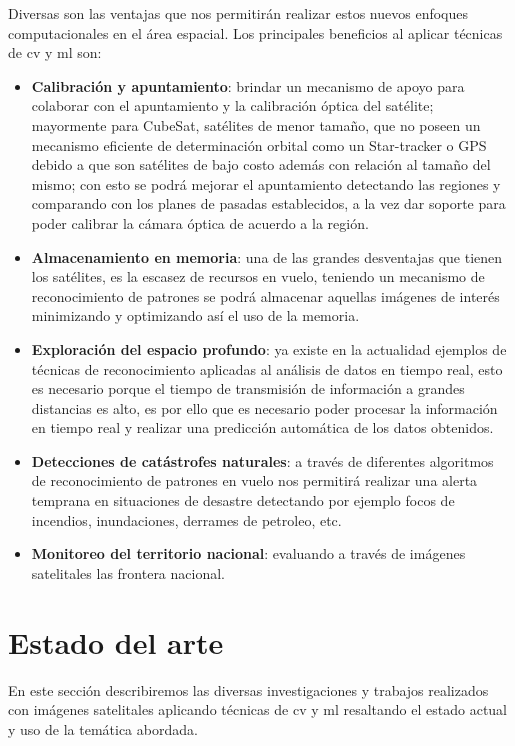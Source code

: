 Diversas son las ventajas que nos permitirán realizar estos nuevos enfoques computacionales en el área espacial. Los principales beneficios al aplicar técnicas de \ac{cv} y \ac{ml} son: 
\begin{itemize}
\item \textbf{Calibración y apuntamiento}: brindar un mecanismo de apoyo para colaborar con el apuntamiento y la calibración óptica del satélite; mayormente para CubeSat, satélites de menor tamaño, que no poseen un mecanismo eficiente de determinación orbital como un Star-tracker o GPS debido a que son satélites de bajo costo además con relación al tamaño del mismo; con esto se podrá mejorar el apuntamiento detectando las regiones y comparando con los planes de pasadas  establecidos, a la vez dar soporte para poder calibrar la cámara óptica de acuerdo a la región.
\item \textbf{Almacenamiento en memoria}: una de las grandes desventajas que tienen los satélites, es la escasez de recursos en vuelo, teniendo un mecanismo de reconocimiento de patrones se podrá almacenar aquellas imágenes de interés minimizando y optimizando  así el uso de la memoria.
\item \textbf{Exploración del espacio profundo}: ya existe en la actualidad ejemplos de técnicas de reconocimiento aplicadas al análisis de datos en tiempo real, esto es necesario  porque el tiempo de transmisión de información a grandes distancias es alto, es por ello que es necesario poder procesar la información en tiempo real y realizar una predicción automática de los datos obtenidos.
\item \textbf{Detecciones de catástrofes naturales}: a través de diferentes algoritmos de reconocimiento de patrones en vuelo nos permitirá realizar una alerta temprana en situaciones de desastre detectando por ejemplo focos de incendios, inundaciones, derrames de petroleo, etc.
\item \textbf{Monitoreo del territorio nacional}: evaluando a través de imágenes satelitales las frontera nacional.
\end{itemize}

\section{Estado del arte} \label{sec:estadodelarte}

En este sección describiremos las diversas investigaciones y trabajos realizados con imágenes satelitales aplicando técnicas de \ac{cv} y \ac{ml} resaltando el estado actual y uso de la temática abordada.

